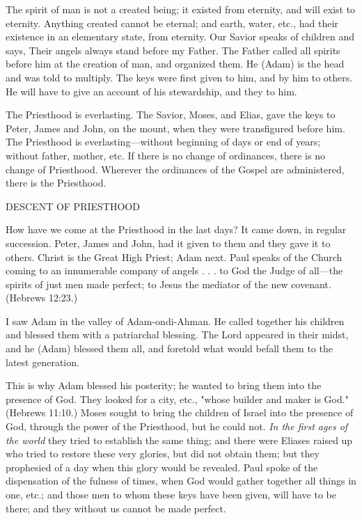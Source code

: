 The spirit of man is not a created being; it existed from eternity, and will exist to eternity.
Anything created cannot be eternal; and earth, water, etc., had their existence in an
elementary state, from eternity. Our Savior speaks of children and says, Their angels always
stand before my Father. The Father called all spirits before him at the creation of man, and
organized them. He (Adam) is the head and was told to multiply. The keys were first given to
him, and by him to others. He will have to give an account of his stewardship, and they to
him.

The Priesthood is everlasting. The Savior, Moses, and Elias, gave the keys to Peter, James
and John, on the mount, when they were transfigured before him. The Priesthood is
everlasting—without beginning of days or end of years; without father, mother, etc. If there
is no change of ordinances, there is no change of Priesthood. Wherever the ordinances of the
Gospel are administered, there is the Priesthood.

DESCENT OF PRIESTHOOD

How have we come at the Priesthood in the last days? It came down, in regular succession.
Peter, James and John, had it given to them and they gave it to others. Christ is the Great
High Priest; Adam next. Paul speaks of the Church coming to an innumerable company of
angels . . . to God the Judge of all—the spirits of just men made perfect; to Jesus the mediator
of the new covenant. (Hebrews 12:23.)

I saw Adam in the valley of Adam-ondi-Ahman. He called together his children and blessed
them with a patriarchal blessing. The Lord appeared in their midst, and he (Adam) blessed
them all, and foretold what would befall them to the latest generation.

This is why Adam blessed his posterity; he wanted to bring them into the presence of God.
They looked for a city, etc., "whose builder and maker is God." (Hebrews 11:10.) Moses
sought to bring the children of Israel into the presence of God, through the power of the
Priesthood, but he could not. \textit{In the first ages of the world} they tried to establish the same
thing; and there were Eliases raised up who tried to restore these very glories, but did not
obtain them; but they prophesied of a day when this glory would be revealed. Paul spoke of
the dispensation of the fulness of times, when God would gather together all things in one,
etc.; and those men to whom these keys have been given, will have to be there; and they
without us cannot be made perfect.

